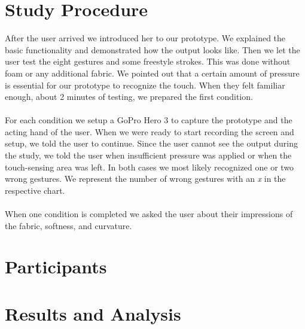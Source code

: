 \section{Study Procedure}
After the user arrived we introduced her to our prototype. We explained the basic functionality and demonstrated how the output looks like. Then we let the user test the eight gestures and some freestyle strokes. This was done without foam or any additional fabric. We pointed out that a certain amount of pressure is essential for our prototype to recognize the touch. When they felt familiar enough, about 2 minutes of testing, we prepared the first condition. 
\\ \\
For each condition we setup a GoPro Hero 3 to capture the prototype and the acting hand of the user. When we were ready to start recording the screen and setup, we told the user to continue. Since the user cannot see the output during the study, we told the user when insufficient  pressure was applied or when the touch-sensing area was left. In both cases we most likely recognized one or two wrong gestures. We represent the number of wrong gestures with an \emph{x} in the respective chart. 
\\ \\
When one condition is completed we asked the user about their impressions of the fabric, softness, and curvature. 
\section{Participants}

\section{Results and Analysis}

